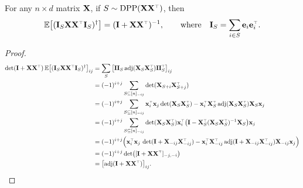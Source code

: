\documentclass[12pt]{sty/colt2019/colt2018-arxiv}
\begin{document}
\begin{theorem}
  For any $n\times d$ matrix $\mathbf X$, if $S\sim \DPP(\X\X^\top)$, then
  \begin{align*}
    \E\big[(\I_S\X\X^\top\I_S)^\dagger\big] = (\I+\X\X^\top)^{-1},\qquad\text{where}\quad\I_S=\sum_{i\in S}\e_i\e_i^\top.
  \end{align*}
\end{theorem}
\begin{proof}
  \begin{align*}
\det(\I+\X\X^\top)\, \E\big[(\I_S\X\X^\top\I_S)^\dagger\big]_{ij}
     &= \sum_{S}\big[\II_S\adj(\X_S\X_S^\top)\II_S^\top\big]_{ij}\\
    &=(-1)^{i+j}\sum_{S\subseteq[n]_{-ij}}\det(\X_{S+i}\X_{S+j}^\top)\\
    &=(-1)^{i+j}\sum_{S\subseteq[n]_{-ij}}\x_i^\top\x_j\det(\X_S\X_S^\top)
      - \x_i^\top\X_S^\top\adj(\X_S\X_S^\top)\X_S\x_j\\
    &=(-1)^{i+j}\sum_{S\subseteq[n]_{-ij}}\det(\X_S\X_S^\top)\x_i^\top\big(\I-\X_S^\top(\X_S\X_S^\top)^{-1}\X_S\big)\x_j\\
    &=(-1)^{i+j}\Big(\x_i^\top\x_j\,\det(\I+\X_{-ij}\X_{-ij}^\top) -
      \x_i^\top\X_{-ij}^\top\adj(\I+\X_{-ij}\X_{-ij}^\top)\X_{-ij}\x_j\Big)\\ 
    &= (-1)^{i+j}\det\!\big([\I + \X\X^\top]_{-j,-i}\big)\\
  &=\big[\!\adj(\I+\X\X^\top)\big]_{ij}.

\end{align*}
\end{proof}
\end{document}
